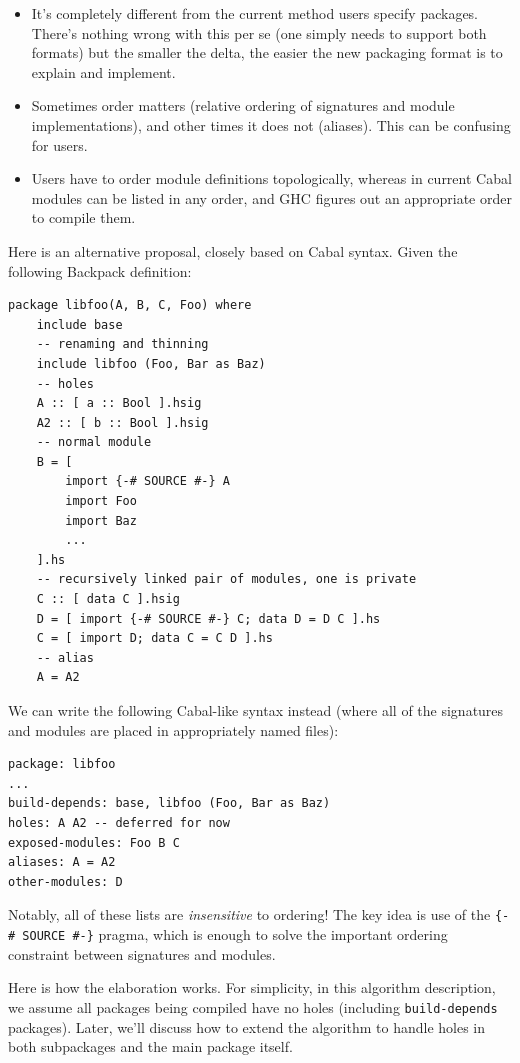 \documentclass{article}
\begin{document}
\begin{itemize}
    \item It's completely different from the current method users
        specify packages. There's nothing wrong with this per se
        (one simply needs to support both formats) but the smaller
        the delta, the easier the new packaging format is to explain
        and implement.

    \item Sometimes order matters (relative ordering of signatures and
        module implementations), and other times it does not (aliases).
        This can be confusing for users.

    \item Users have to order module definitions topologically,
        whereas in current Cabal modules can be listed in any order, and
        GHC figures out an appropriate order to compile them.
\end{itemize}

Here is an alternative proposal, closely based on Cabal syntax.  Given
the following Backpack definition:

\begin{verbatim}
package libfoo(A, B, C, Foo) where
    include base
    -- renaming and thinning
    include libfoo (Foo, Bar as Baz)
    -- holes
    A :: [ a :: Bool ].hsig
    A2 :: [ b :: Bool ].hsig
    -- normal module
    B = [
        import {-# SOURCE #-} A
        import Foo
        import Baz
        ...
    ].hs
    -- recursively linked pair of modules, one is private
    C :: [ data C ].hsig
    D = [ import {-# SOURCE #-} C; data D = D C ].hs
    C = [ import D; data C = C D ].hs
    -- alias
    A = A2
\end{verbatim}

We can write the following Cabal-like syntax instead (where
all of the signatures and modules are placed in appropriately
named files):

\begin{verbatim}
package: libfoo
...
build-depends: base, libfoo (Foo, Bar as Baz)
holes: A A2 -- deferred for now
exposed-modules: Foo B C
aliases: A = A2
other-modules: D
\end{verbatim}

Notably, all of these lists are \emph{insensitive} to ordering!
The key idea is use of the \verb|{-# SOURCE #-}| pragma, which
is enough to solve the important ordering constraint between
signatures and modules.

Here is how the elaboration works.  For simplicity, in this algorithm
description, we assume all packages being compiled have no holes
(including \verb|build-depends| packages). Later, we'll discuss how to
extend the algorithm to handle holes in both subpackages and the main
package itself.
\end{document}
